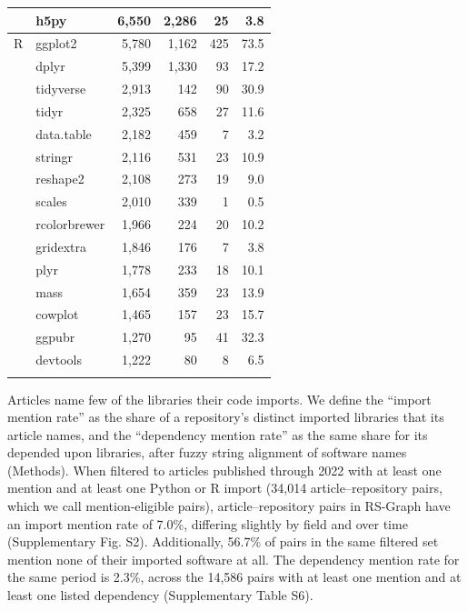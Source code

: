 \documentclass[pdflatex,sn-nature]{sn-jnl}%
\begin{document}
\begin{table}[ht]
\begin{tabular}{@{}llrrrr@{}}
 & h5py & 6,550 & 2,286 & 25 & 3.8 \\
\midrule
R & ggplot2 & 5,780 & 1,162 & 425 & 73.5 \\
 & dplyr & 5,399 & 1,330 & 93 & 17.2 \\
 & tidyverse & 2,913 & 142 & 90 & 30.9 \\
 & tidyr & 2,325 & 658 & 27 & 11.6 \\
 & data.table & 2,182 & 459 & 7 & 3.2 \\
 & stringr & 2,116 & 531 & 23 & 10.9 \\
 & reshape2 & 2,108 & 273 & 19 & 9.0 \\
 & scales & 2,010 & 339 & 1 & 0.5 \\
 & rcolorbrewer & 1,966 & 224 & 20 & 10.2 \\
 & gridextra & 1,846 & 176 & 7 & 3.8 \\
 & plyr & 1,778 & 233 & 18 & 10.1 \\
 & mass & 1,654 & 359 & 23 & 13.9 \\
 & cowplot & 1,465 & 157 & 23 & 15.7 \\
 & ggpubr & 1,270 & 95 & 41 & 32.3 \\
 & devtools & 1,222 & 80 & 8 & 6.5 \\
\botrule
\end{tabular}
\end{table}

Articles name few of the libraries their code imports. We define the ``import mention rate'' as the share of a repository's distinct imported libraries that its article names, and the ``dependency mention rate'' as the same share for its depended upon libraries, after fuzzy string alignment of software names (Methods). When filtered to articles published through 2022 with at least one mention and at least one Python or R import (34,014 article--repository pairs, which we call mention-eligible pairs), article--repository pairs in RS-Graph have an import mention rate of 7.0\%, differing slightly by field and over time (Supplementary Fig. S2). Additionally, 56.7\% of pairs in the same filtered set mention none of their imported software at all. The dependency mention rate for the same period is 2.3\%, across the 14,586 pairs with at least one mention and at least one listed dependency (Supplementary Table S6).
\end{document}
